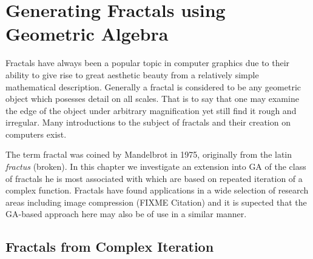 \chapter{Generating Fractals using Geometric Algebra}

Fractals have always been a popular topic in computer graphics due
to their ability to give rise to great aesthetic beauty from a relatively
simple mathematical description. Generally a fractal is considered to be
any geometric object which posesses detail on all scales\cite{FRAC:FractalsEverywhere,
  FRAC:FractalGeometryOfNature}. That is to say
that one may examine the edge of the object under arbitrary magnification
yet still find it rough and irregular. Many introductions to the 
subject of fractals and their creation on computers exist\cite{FRAC:FractalGeometry, FRAC:ChaosAndFractals, FRAC:FractalImages}.

The term fractal was coined by Mandelbrot\cite{FRAC:LesObjetsFractals} in 1975,
originally from the latin {\em fractus} (broken). In this chapter we
investigate an extension into GA of the class of fractals he is most 
associated with which are based on repeated iteration of a complex function.
Fractals have found applications in a wide selection of research areas
including image compression (FIXME Citation) and it is supected that the 
GA-based approach here may also be of use in a similar manner.

\section{Fractals from Complex Iteration}

